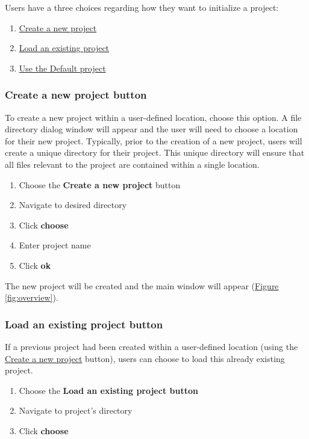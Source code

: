 \documentclass[10pt]{article}
\begin{document}
		Users have a three choices regarding how they want to initialize a project:
		\begin{enumerate}
			\item \hyperref[subsubsec:new]{Create a new project}
			\item \hyperref[subsubsec:load]{Load an existing project}
			\item \hyperref[subsec:default]{Use the Default  project}
		\end{enumerate}

		\subsubsection{Create a new project button}
		\label{subsubsec:new}
			To create a new project within a user-defined location, choose this option. 
			A file directory dialog window will appear and the user will need to choose a location for their new project.
			Typically, prior to the creation of a new project, users will create a unique directory for their project.
			This unique directory will ensure that all files relevant to the project are contained within a single location.
			\begin{enumerate}
				\item Choose the \textbf{Create a new project} button
				\item Navigate to desired directory
				\item Click \textbf{choose}
				\item Enter project name
				\item Click \textbf{ok}
			\end{enumerate}

			The new project will be created and the main window will appear (\hyperref[fig:overview]{Figure \ref{fig:overview}}).

		\subsubsection{Load an existing project button}
		\label{subsubsec:load}
			If a previous project had been created within a user-defined location (using the \hyperref[subsubsec:new]{Create a new project} button), users can choose to load this already existing project.
			\begin{enumerate}
				\item Choose the \textbf{Load an existing project button}
				\item Navigate to project's directory
				\item Click \textbf{choose}
			\end{enumerate}
\end{document}
